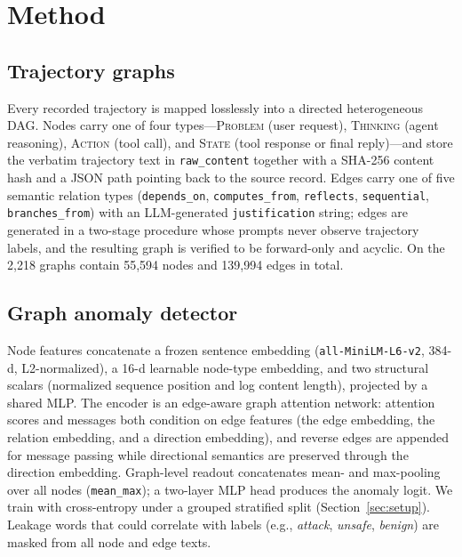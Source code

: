 \section{Method}
\label{sec:method}

\subsection{Trajectory graphs}
\label{sec:method-graphs}
Every recorded trajectory is mapped losslessly into a directed heterogeneous DAG. Nodes carry one of four types---\textsc{Problem} (user request), \textsc{Thinking} (agent reasoning), \textsc{Action} (tool call), and \textsc{State} (tool response or final reply)---and store the verbatim trajectory text in \texttt{raw\_content} together with a SHA-256 content hash and a JSON path pointing back to the source record. Edges carry one of five semantic relation types (\texttt{depends\_on}, \texttt{computes\_from}, \texttt{reflects}, \texttt{sequential}, \texttt{branches\_from}) with an LLM-generated \texttt{justification} string; edges are generated in a two-stage procedure whose prompts never observe trajectory labels, and the resulting graph is verified to be forward-only and acyclic. On \tool{} the 2{,}218 graphs contain 55{,}594 nodes and 139{,}994 edges in total.

\subsection{Graph anomaly detector}
\label{sec:method-detector}
Node features concatenate a frozen sentence embedding (\texttt{all-MiniLM-L6-v2}, 384-d, L2-normalized), a 16-d learnable node-type embedding, and two structural scalars (normalized sequence position and log content length), projected by a shared MLP. The encoder is an edge-aware graph attention network: attention scores and messages both condition on edge features (the edge embedding, the relation embedding, and a direction embedding), and reverse edges are appended for message passing while directional semantics are preserved through the direction embedding. Graph-level readout concatenates mean- and max-pooling over all nodes (\texttt{mean\_max}); a two-layer MLP head produces the anomaly logit. We train with cross-entropy under a grouped stratified split (Section~\ref{sec:setup}). Leakage words that could correlate with labels (e.g., \emph{attack}, \emph{unsafe}, \emph{benign}) are masked from all node and edge texts.

